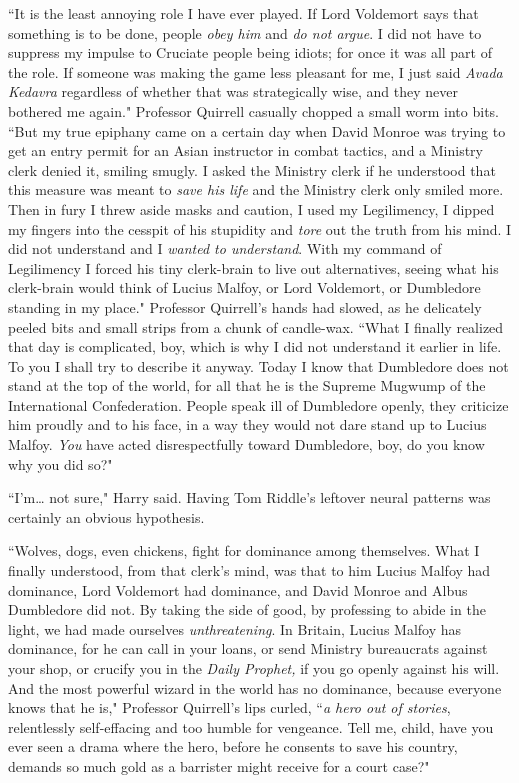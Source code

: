 ``It is the least annoying role I have ever played. If Lord Voldemort says that something is to be done, people \emph{obey him} and \emph{do not argue}. I did not have to suppress my impulse to Cruciate people being idiots; for once it was all part of the role. If someone was making the game less pleasant for me, I just said \emph{Avada Kedavra} regardless of whether that was strategically wise, and they never bothered me again." Professor Quirrell casually chopped a small worm into bits. ``But my true epiphany came on a certain day when David Monroe was trying to get an entry permit for an Asian instructor in combat tactics, and a Ministry clerk denied it, smiling smugly. I asked the Ministry clerk if he understood that this measure was meant to \emph{save his life} and the Ministry clerk only smiled more. Then in fury I threw aside masks and caution, I used my Legilimency, I dipped my fingers into the cesspit of his stupidity and \emph{tore} out the truth from his mind. I did not understand and I \emph{wanted to understand}. With my command of Legilimency I forced his tiny clerk-brain to live out alternatives, seeing what his clerk-brain would think of Lucius Malfoy, or Lord Voldemort, or Dumbledore standing in my place." Professor Quirrell's hands had slowed, as he delicately peeled bits and small strips from a chunk of candle-wax. ``What I finally realized that day is complicated, boy, which is why I did not understand it earlier in life. To you I shall try to describe it anyway. Today I know that Dumbledore does not stand at the top of the world, for all that he is the Supreme Mugwump of the International Confederation. People speak ill of Dumbledore openly, they criticize him proudly and to his face, in a way they would not dare stand up to Lucius Malfoy. \emph{You} have acted disrespectfully toward Dumbledore, boy, do you know why you did so?"

``I'm{\ldots} not sure," Harry said. Having Tom Riddle's leftover neural patterns was certainly an obvious hypothesis.

``Wolves, dogs, even chickens, fight for dominance among themselves. What I finally understood, from that clerk's mind, was that to him Lucius Malfoy had dominance, Lord Voldemort had dominance, and David Monroe and Albus Dumbledore did not. By taking the side of good, by professing to abide in the light, we had made ourselves \emph{unthreatening}. In Britain, Lucius Malfoy has dominance, for he can call in your loans, or send Ministry bureaucrats against your shop, or crucify you in the \emph{Daily Prophet,} if you go openly against his will. And the most powerful wizard in the world has no dominance, because everyone knows that he is," Professor Quirrell's lips curled, ``\emph{a hero out of stories}, relentlessly self-effacing and too humble for vengeance. Tell me, child, have you ever seen a drama where the hero, before he consents to save his country, demands so much gold as a barrister might receive for a court case?"

